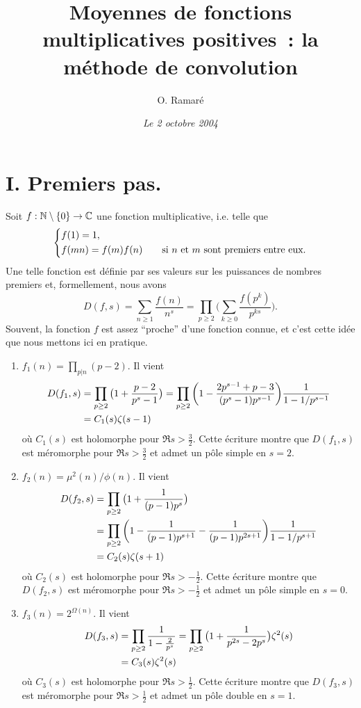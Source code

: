 \documentclass[12pt,a4paper,twoside]{article}
\title{Moyennes de fonctions multiplicatives positives~: la m\'ethode de convolution}
\author{O. Ramar\'e}
\date{\sl Le 2 octobre 2004}
\def\goes{\mathrel{\rightarrow}}
\begin{document}
\maketitle
\section{I. Premiers pas.}

Soit $f:\Bbb N\setminus\{0\}\goes\Bbb C$ une fonction multiplicative,
i.e. telle que
$$
\left\{
\aligned
&f(1)=1,\\
&f(mn)=f(m)f(n)\qquad\text{si $n$ et $m$ sont premiers entre eux.}
\endaligned
\right.
$$
Une telle fonction est d\'efinie par ses valeurs sur les puissances de
nombres premiers et, formellement, nous avons
$$
D(f,s)=\sum_{n\ge1}\frac{f(n)}{n^s}
=\prod_{p\ge2}\big(\sum_{k\ge0}\frac{f(p^k)}{p^{ks}}\big).
$$
Souvent, la fonction $f$ est assez ``proche'' d'une fonction
connue, et c'est cette id\'ee que nous mettons ici en pratique.


\begin{enumerate}
\item $f_1(n)=\prod_{p|n}(p-2)$. Il vient
$$
\aligned
D(f_1,s)
&=\prod_{p\ge2}\big(1+\frac{p-2}{p^s-1}\big)
=\prod_{p\ge2}\bigg(1-\frac{2p^{s-1}+p-3}{(p^s-1)p^{s-1}}\bigg)\frac{1}{1-1/p^{s-1}}
\\&=C_1(s)\zeta(s-1)
\endaligned
$$
o\`u $C_1(s)$ est holomorphe pour $\Re s>\tfrac32$. Cette \'ecriture
montre que $D(f_1,s)$ est m\'eromorphe pour $\Re s>\tfrac32$ et admet
un p\^ole simple en $s=2$.

\item  $f_2(n)=\mu^2(n)/\phi(n)$. Il vient
$$
\aligned
D(f_2,s)
&=\prod_{p\ge2}\big(1+\frac{1}{(p-1)p^s}\big)
\\&=\prod_{p\ge2}\bigg(1-\frac{1}{(p-1)p^{s+1}}-\frac{1}{(p-1)p^{2s+1}}\bigg)
\frac{1}{1-1/p^{s+1}}
\\&=C_2(s)\zeta(s+1)
\endaligned
$$
o\`u $C_2(s)$ est holomorphe pour $\Re s>-\tfrac12$. Cette \'ecriture
montre que $D(f_2,s)$ est m\'eromorphe pour $\Re s>-\tfrac12$ et admet
un p\^ole simple en $s=0$.

\item  $f_3(n)=2^{\Omega(n)}$. Il vient
$$
\aligned
D(f_3,s)
&=\prod_{p\ge2}\frac{1}{1-\frac{2}{p^s}}
=\prod_{p\ge2}\big(1+\frac{1}{p^{2s}-2p^s}\big)
\zeta^2(s)
\\&=C_3(s)\zeta^2(s)
\endaligned
$$
o\`u $C_3(s)$ est holomorphe pour $\Re s>\tfrac12$. Cette \'ecriture
montre que $D(f_3,s)$ est m\'eromorphe pour $\Re s>\tfrac12$ et admet
un p\^ole double en $s=1$.
\end{enumerate}
\end{document}
